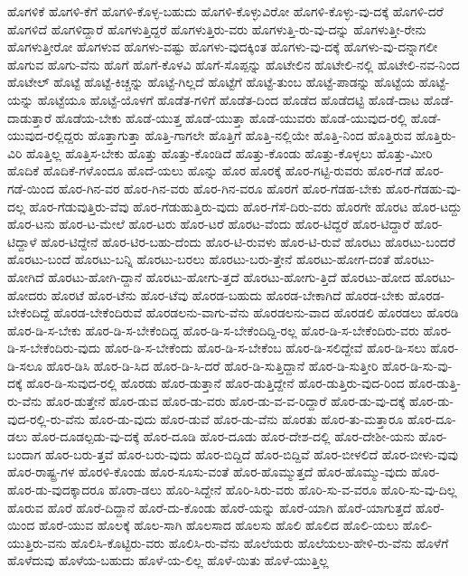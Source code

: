{ಹೊಗಳಿಕೆ
ಹೊಗಳಿ-ಕೆಗೆ
ಹೊಗಳಿ-ಕೊಳ್ಳ-ಬಹುದು
ಹೊಗಳಿ-ಕೊಳ್ಳುವಿರೋ
ಹೊಗಳಿ-ಕೊಳ್ಳು-ವು-ದಕ್ಕೆ
ಹೊಗಳಿ-ದರೆ
ಹೊಗಳಿದೆ
ಹೊಗಳಿದ್ದಾರೆ
ಹೊಗಳುತ್ತಿದ್ದರೆ
ಹೊಗಳುತ್ತಿರು-ವರು
ಹೊಗಳುತ್ತಿ-ರು-ವು-ದನ್ನು
ಹೊಗಳುತ್ತೀ-ರೇನು
ಹೊಗಳುತ್ತೀರೋ
ಹೊಗಳುವ
ಹೊಗಳು-ವಷ್ಟು
ಹೊಗಳು-ವುದಕ್ಕಿಂತ
ಹೊಗಳು-ವು-ದಕ್ಕೆ
ಹೊಗಳು-ವು-ದನ್ನಾಗಲೀ
ಹೊಗುವ
ಹೊಗು-ವೆನು
ಹೊಗೆ
ಹೊಗೆ-ಕೊಳವಿ
ಹೊಗೆ-ಸೊಪ್ಪನ್ನು
ಹೊಟೇಲಿನ
ಹೊಟೇಲಿ-ನಲ್ಲಿ
ಹೊಟೇಲಿ-ನವ-ನಿಂದ
ಹೊಟೇಲ್
ಹೊಟ್ಟೆ
ಹೊಟ್ಟೆ-ಕಿಚ್ಚನ್ನು
ಹೊಟ್ಟೆ-ಗಿಲ್ಲದೆ
ಹೊಟ್ಟೆಗೆ
ಹೊಟ್ಟೆ-ತುಂಬ
ಹೊಟ್ಟೆ-ಪಾಡನ್ನು
ಹೊಟ್ಟೆಯ
ಹೊಟ್ಟೆ-ಯನ್ನು
ಹೊಟ್ಟೆಯೂ
ಹೊಟ್ಟೆ-ಯೊಳಗೆ
ಹೊಡೆತ-ಗಳಿಗೆ
ಹೊಡೆತ-ದಿಂದ
ಹೊಡೆದ
ಹೊಡೆದಟ್ಟಿ
ಹೊಡೆ-ದಾಟ
ಹೊಡೆ-ದಾಡುತ್ತಾರೆ
ಹೊಡೆಯ-ಬೇಕು
ಹೊಡೆ-ಯುತ್ತ
ಹೊಡೆ-ಯುತ್ತಾ
ಹೊಡೆ-ಯುವರು
ಹೊಡೆ-ಯುವುದ-ರಲ್ಲಿ
ಹೊಡೆ-ಯುವುದ-ರಲ್ಲಿದ್ದರು
ಹೊತ್ತಾಗುತ್ತಾ
ಹೊತ್ತಿ-ಗಾಗಲೇ
ಹೊತ್ತಿಗೆ
ಹೊತ್ತಿ-ನಲ್ಲಿಯೇ
ಹೊತ್ತಿ-ನಿಂದ
ಹೊತ್ತಿರುವ
ಹೊತ್ತಿರು-ವಿರಿ
ಹೊತ್ತಿಲ್ಲ
ಹೊತ್ತಿಸ-ಬೇಕು
ಹೊತ್ತು
ಹೊತ್ತು-ಕೊಂಡಿದೆ
ಹೊತ್ತು-ಕೊಂಡು
ಹೊತ್ತು-ಕೊಳ್ಳಲು
ಹೊತ್ತು-ಮೀರಿ
ಹೊದಿಕೆ
ಹೊದಿಕೆ-ಗಳೊಂದೂ
ಹೊದೆ-ಯಲು
ಹೊನ್ನು
ಹೊರ
ಹೊರಕ್ಕೆ
ಹೊರ-ಗಟ್ಟಿ-ರುವರು
ಹೊರ-ಗಡೆ
ಹೊರ-ಗಡೆ-ಯಿಂದ
ಹೊರ-ಗಿನ-ವರ
ಹೊರ-ಗಿನ-ವರು
ಹೊರ-ಗಿನ-ವರೂ
ಹೊರಗೆ
ಹೊರ-ಗೆಡಹ-ಬೇಕು
ಹೊರ-ಗೆಡಹು-ವು-ದಲ್ಲ
ಹೊರ-ಗೆಡುವುತ್ತಿರು-ವೆವು
ಹೊರ-ಗೆಡುಹುತ್ತಿರು-ವುದು
ಹೊರ-ಗೆಸೆ-ದಿರು-ವರು
ಹೊರಗೇ
ಹೊರಟ
ಹೊರ-ಟದ್ದು
ಹೊರ-ಟನು
ಹೊರ-ಟ-ಮೇಲೆ
ಹೊರ-ಟರು
ಹೊರ-ಟರೆ
ಹೊರಟ-ವೆಂದು
ಹೊರ-ಟಿದ್ದರೆ
ಹೊರ-ಟಿದ್ದಾರೆ
ಹೊರ-ಟಿದ್ದಾಳೆ
ಹೊರ-ಟಿದ್ದೇನೆ
ಹೊರ-ಟಿರ-ಬಹು-ದೆಂದು
ಹೊರ-ಟಿ-ರುವಳು
ಹೊರ-ಟಿ-ರುವೆ
ಹೊರಟು
ಹೊರಟು-ಬಂದರೆ
ಹೊರಟು-ಬಂದೆ
ಹೊರಟು-ಬನ್ನಿ
ಹೊರಟು-ಬರಲು
ಹೊರಟು-ಬರು-ತ್ತೇನೆ
ಹೊರಟು-ಹೋಗ-ದಂತೆ
ಹೊರಟು-ಹೋಗಿದೆ
ಹೊರಟು-ಹೋಗಿ-ದ್ದಾನೆ
ಹೊರಟು-ಹೋಗು-ತ್ತದೆ
ಹೊರಟು-ಹೋಗು-ತ್ತಿದೆ
ಹೊರಟು-ಹೋದ
ಹೊರಟು-ಹೋದರು
ಹೊರಟೆ
ಹೊರ-ಟೆನು
ಹೊರ-ಟೆವು
ಹೊರಡ-ಬಹುದು
ಹೊರಡ-ಬೇಕಾಗಿದೆ
ಹೊರಡ-ಬೇಕು
ಹೊರಡ-ಬೇಕೆಂದಿದ್ದೆ
ಹೊರಡ-ಬೇಕೆಂದಿರುವೆ
ಹೊರಡಲನು-ವಾಗು-ವೆನು
ಹೊರಡಲನು-ವಾದ
ಹೊರಡಲಿ
ಹೊರಡಲು
ಹೊರಡಿ
ಹೊರ-ಡಿ-ಸ-ಬೇಕು
ಹೊರ-ಡಿ-ಸ-ಬೇಕೆಂದಿದ್ದ
ಹೊರ-ಡಿ-ಸ-ಬೇಕೆಂದಿದ್ದಿ-ರಲ್ಲ
ಹೊರ-ಡಿ-ಸ-ಬೇಕೆಂದಿರು-ವರು
ಹೊರ-ಡಿ-ಸ-ಬೇಕೆಂದಿರು-ವುದು
ಹೊರ-ಡಿ-ಸ-ಬೇಕೆಂದು
ಹೊರ-ಡಿ-ಸ-ಬೇಕೆಂಬ
ಹೊರ-ಡಿ-ಸಲಿದ್ದೇವೆ
ಹೊರ-ಡಿ-ಸಲು
ಹೊರ-ಡಿ-ಸಲೂ
ಹೊರ-ಡಿಸಿ
ಹೊರ-ಡಿ-ಸಿದ
ಹೊರ-ಡಿ-ಸಿ-ದರೆ
ಹೊರ-ಡಿ-ಸುತ್ತಿದ್ದಾನೆ
ಹೊರ-ಡಿ-ಸುತ್ತೀರಿ
ಹೊರ-ಡಿ-ಸು-ವು-ದಕ್ಕೆ
ಹೊರ-ಡಿ-ಸುವುದ-ರಲ್ಲಿ
ಹೊರಡು
ಹೊರ-ಡುತ್ತಾನೆ
ಹೊರ-ಡುತ್ತಿದ್ದೇನೆ
ಹೊರ-ಡುತ್ತಿರು-ವುದ-ರಿಂದ
ಹೊರ-ಡುತ್ತಿ-ರು-ವೆನು
ಹೊರ-ಡುತ್ತೇನೆ
ಹೊರ-ಡುವ
ಹೊರ-ಡು-ವರು
ಹೊರ-ಡು-ವ-ವ-ರಿದ್ದಾರೆ
ಹೊರ-ಡು-ವು-ದಕ್ಕೆ
ಹೊರ-ಡು-ವುದ-ರಲ್ಲಿ-ರು-ವೆನು
ಹೊರ-ಡು-ವುದು
ಹೊರ-ಡುವೆ
ಹೊರ-ಡು-ವೆನು
ಹೊರತು
ಹೊರ-ತು-ಮತ್ತಾರೂ
ಹೊರ-ದೂ-ಡಲು
ಹೊರ-ದೂಡಲ್ಪಡು-ವು-ದಕ್ಕೆ
ಹೊರ-ದೂಡಿ
ಹೊರ-ದೂಡು
ಹೊರ-ದೇಶ-ದಲ್ಲಿ
ಹೊರ-ದೇಶೀ-ಯನು
ಹೊರ-ಬಂದಾಗ
ಹೊರ-ಬರು-ತ್ತವೆ
ಹೊರ-ಬರು-ವುದು
ಹೊರ-ಬಿದ್ದಿದೆ
ಹೊರ-ಬಿದ್ದಿವೆ
ಹೊರ-ಬೀಳಲಿದೆ
ಹೊರ-ಬೀಳು-ವುವು
ಹೊರ-ರಾಷ್ಟ್ರ-ಗಳ
ಹೊರಳಿ-ಕೊಂಡು
ಹೊರ-ಸೂಸು-ವಂತೆ
ಹೊರ-ಹೊಮ್ಮುತ್ತದೆ
ಹೊರ-ಹೊಮ್ಮು-ವುದು
ಹೊರ-ಹೊರ-ಡು-ವುದಕ್ಕಾದರೂ
ಹೊರಾ-ಡಲು
ಹೊರಿ-ಸಿದ್ದೇನೆ
ಹೊರಿ-ಸಿರು-ವರು
ಹೊರಿ-ಸು-ವ-ವರೂ
ಹೊರಿ-ಸು-ವು-ದಿಲ್ಲ
ಹೊರುವ
ಹೊರೆ
ಹೊರೆ-ದಿದ್ದಾನೆ
ಹೊರೆ-ದು-ಕೊಂಡು
ಹೊರೆ-ಯನ್ನು
ಹೊರೆ-ಯಾಗಿ
ಹೊರೆ-ಯಾಗುತ್ತದೆ
ಹೊರೆ-ಯಿಂದ
ಹೊರೆ-ಯುವ
ಹೊಲಕ್ಕೆ
ಹೊಲ-ಸಾಗಿ
ಹೊಲಸಾದ
ಹೊಲಸು
ಹೊಲಿ
ಹೊಲಿದ
ಹೊಲಿ-ಯಲು
ಹೊಲಿ-ಯುತ್ತಿರು-ವನು
ಹೊಲಿಸಿ-ಕೊಟ್ಟಿರು-ವರು
ಹೊಲಿಸಿ-ರು-ವೆನು
ಹೊಲೆಯರು
ಹೊಲೆಯಲು-ಹೇಳಿ-ರು-ವೆನು
ಹೊಳೆಗೆ
ಹೊಳೆದುವು
ಹೊಳೆಯ-ಬಹುದು
ಹೊಳೆ-ಯ-ಲಿಲ್ಲ
ಹೊಳೆ-ಯಿತು
ಹೊಳೆ-ಯುತ್ತಿಲ್ಲ
}
